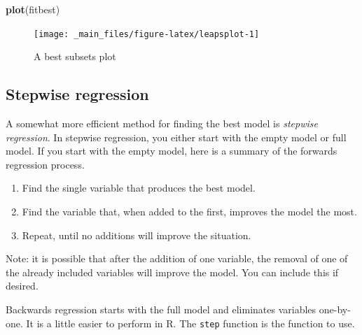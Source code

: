 \documentclass[
]{book}
\newenvironment{Shaded}{\begin{snugshade}}{\end{snugshade}}
\newcommand{\FunctionTok}[1]{\textcolor[rgb]{0.13,0.29,0.53}{\textbf{#1}}}
\newcommand{\NormalTok}[1]{#1}
\theoremstyle{definition}
\theoremstyle{definition}
\theoremstyle{definition}
\theoremstyle{definition}
\theoremstyle{remark}
\begin{document}
\begin{Shaded}
\begin{Highlighting}[]
\FunctionTok{plot}\NormalTok{(fitbest)}
\end{Highlighting}
\end{Shaded}

\begin{figure}

{\centering \texttt{[image: \_main\_files/figure-latex/leapsplot-1]} 

}

\caption{A best subsets plot}\label{fig:leapsplot}
\end{figure}

\subsection*{Stepwise regression}\label{stepwise-regression}

A somewhat more efficient method for finding the best model is \emph{stepwise regression}. In stepwise regression, you either start with the empty model or full model. If you start with the empty model, here is a summary of the forwards regression process.

\begin{enumerate}
\def\labelenumi{\arabic{enumi}.}
\item
  Find the single variable that produces the best model.
\item
  Find the variable that, when added to the first, improves the model the most.
\item
  Repeat, until no additions will improve the situation.
\end{enumerate}

Note: it is possible that after the addition of one variable, the removal of one of the already included variables will improve the model. You can include this if desired.

Backwards regression starts with the full model and eliminates variables one-by-one. It is a little easier to perform in R. The \texttt{step} function is the function to use.
\end{document}
